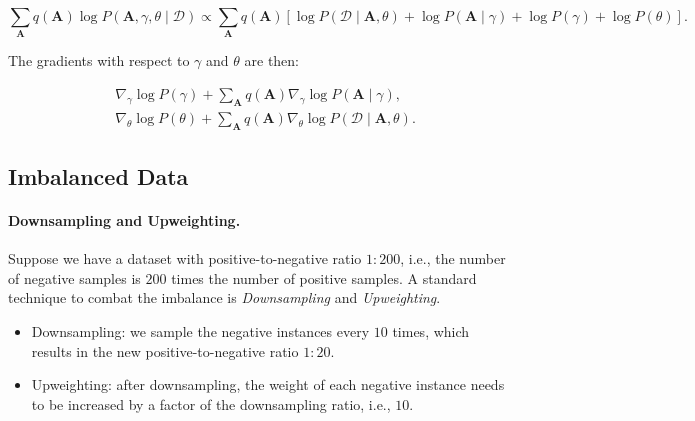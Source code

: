 {\begin{enumerate}
    \begin{equation}
        \sum_{\bm{A}}{
            q(\bm{A}) \log P(\bm{A}, \gamma, \theta \mid \mathcal{D})
        } \propto \sum_{\bm{A}}{
            q(\bm{A}) \left[  \log P(\mathcal{D} \mid \bm{A}, \theta) + \log P(\bm{A} \mid \gamma) + \log P(\gamma) + \log P(\theta) \right]
        }.
    \end{equation}

    The gradients with respect to \(\gamma\) and \(\theta\) are then:

    \begin{equation}
        \begin{aligned}
        & \nabla_\gamma \log P(\gamma) + \sum_{\bm{A}}{q(\bm{A}) \nabla_{\gamma} \log P(\bm{A} \mid \gamma)}, \\
        & \nabla_\theta \log P(\theta) + \sum_{\bm{A}}{q(\bm{A}) \nabla_\theta \log P(\mathcal{D} \mid \bm{A}, \theta)}.
        \end{aligned}
    \end{equation}
\end{enumerate}

    
        

\subsection{Imbalanced Data}
    \paragraph{Downsampling and Upweighting.}
    Suppose we have a dataset with positive-to-negative ratio $1:200$, i.e., the number of negative samples is $200$ times the number of positive samples.
    A standard technique to combat the imbalance is \emph{Downsampling} and \emph{Upweighting}.
        \begin{itemize}
            \item Downsampling: we sample the negative instances every $10$ times, which results in the new positive-to-negative ratio $1:20$.
            \item Upweighting: after downsampling, the weight of each negative instance needs to be increased by a factor of the downsampling ratio, i.e., $10$.
        \end{itemize}
        
}
